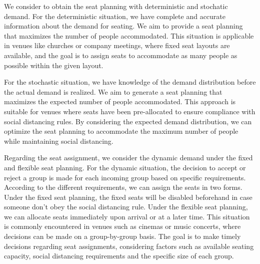We consider to obtain the seat planning with deterministic and stochatic demand. For the deterministic situation, we have complete and accurate information about the demand for seating. We aim to provide a seat planning that maximizes the number of people accommodated. This situation is applicable in venues like churches or company meetings, where fixed seat layouts are available, and the goal is to assign seats to accommodate as many people as possible within the given layout.


For the stochastic situation, we have knowledge of the demand distribution before the actual demand is realized. We aim to generate a seat planning that maximizes the expected number of people accommodated. This approach is suitable for venues where seats have been pre-allocated to ensure compliance with social distancing rules. By considering the expected demand distribution, we can optimize the seat planning to accommodate the maximum number of people while maintaining social distancing.

Regarding the seat assignment, we consider the dynamic demand under the fixed and flexible seat planning. For the dynamic situation, the decision to accept or reject a group is made for each incoming group based on specific requirements. According to the different requirements, we can assign the seats in two forms. Under the fixed seat planning, the fixed seats will be disabled beforehand in case someone don't obey the social distancing rule. Under the flexible seat planning, we can allocate seats immediately upon arrival or at a later time. This situation is commonly encountered in venues such as cinemas or music concerts, where decisions can be made on a group-by-group basis. The goal is to make timely decisions regarding seat assignments, considering factors such as available seating capacity, social distancing requirements and the specific size of each group.




